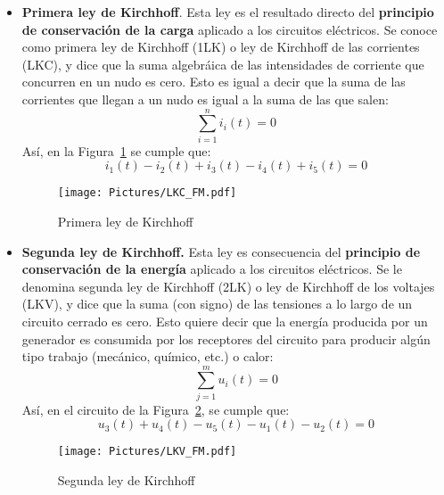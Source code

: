 \documentclass[11pt]{book} %
\numberwithin{dummy}{section}
\theoremstyle{ocrenumbox}
\theoremstyle{blacknumex}
\theoremstyle{blacknumbox}
\theoremstyle{ocrenum}
\begin{document}
	\begin{itemize}
		\item \textbf{Primera ley de Kirchhoff}. Esta ley es el resultado directo del \textbf{principio de conservación de la carga} aplicado a los circuitos eléctricos. Se conoce como primera ley de Kirchhoff (1LK) o ley de Kirchhoff de las corrientes (LKC), y dice que la suma algebráica de las intensidades de corriente que concurren en un nudo es cero. Esto es igual a decir que la suma de las corrientes que llegan a un nudo es igual a la suma de las que salen: 
		\begin{equation}
			\boxed{\sum_{i=1}^n i_i(t)=0}
		\end{equation}
		Así, en la Figura~\ref{fig.LKC_FM} se cumple que:
		\begin{equation*}
			i_1(t) - i_2(t) + i_3(t) - i_4(t) + i_5(t) = 0
		\end{equation*}
		
		\begin{figure}[htbp]
			\centering
			\texttt{[image: Pictures/LKC\_FM.pdf]}
			\caption{Primera ley de Kirchhoff}
			\label{fig.LKC_FM}
		\end{figure}
		\item \textbf{Segunda ley de Kirchhoff.} Esta ley es consecuencia del \textbf{principio de conservación de la energía} aplicado a los circuitos eléctricos. Se le
		denomina segunda ley de Kirchhoff (2LK) o ley de Kirchhoff de los voltajes (LKV), y dice que la suma (con signo) de las tensiones a lo largo de un circuito cerrado es cero. Esto quiere decir que la energía producida por un generador es consumida por los receptores del circuito
		para producir algún tipo trabajo (mecánico, químico, etc.) o calor:
		\begin{equation}
			\boxed{\sum_{j=1}^m u_i(t)=0}
		\end{equation}
		Así, en el circuito de la Figura~\ref{fig.LKV_FM}, se cumple que:
		\begin{equation*}
			u_3(t) + u_4 (t) - u_5 (t) - u_1 (t) - u_2 (t)  = 0 
		\end{equation*}
		\begin{figure}[htbp]
			\centering
			\texttt{[image: Pictures/LKV\_FM.pdf]}
			\caption{Segunda ley de Kirchhoff}
			\label{fig.LKV_FM}
		\end{figure}
	\end{itemize}
	
\end{document}
